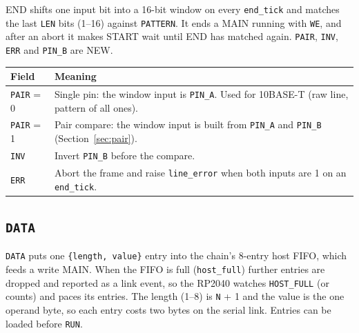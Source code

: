 \documentclass[11pt,a4paper]{article}
\newcommand{\new}{\textcolor{newc}{\textsf{\small NEW}}}
\newcommand{\sig}[1]{\texttt{#1}}
\begin{document}
END shifts one input bit into a 16-bit window on every \sig{end\_tick} and matches the last \sig{LEN} bits (1--16) against \sig{PATTERN}. It ends a MAIN running with \sig{WE}, and after an abort it makes START wait until END has matched again. \sig{PAIR}, \sig{INV}, \sig{ERR} and \sig{PIN\_B} are \new.

\begin{tabularx}{\linewidth}{@{}l>{\raggedright\arraybackslash}X@{}}
\toprule
Field & Meaning \\
\midrule
\sig{PAIR} = 0 & Single pin: the window input is \sig{PIN\_A}. Used for 10BASE-T (raw line, pattern of all ones). \\
\sig{PAIR} = 1 & Pair compare: the window input is built from \sig{PIN\_A} and \sig{PIN\_B} (Section~\ref{sec:pair}). \\
\sig{INV} & Invert \sig{PIN\_B} before the compare. \\
\sig{ERR} & Abort the frame and raise \sig{line\_error} when both inputs are 1 on an \sig{end\_tick}. \\
\bottomrule
\end{tabularx}

\subsection{\sig{DATA}}

\sig{DATA} puts one \texttt{\{length, value\}} entry into the chain's 8-entry host FIFO, which feeds a write MAIN. When the FIFO is full (\sig{host\_full}) further entries are dropped and reported as a link event, so the RP2040 watches \sig{HOST\_FULL} (or counts) and paces its entries. The length (1--8) is \sig{N} + 1 and the value is the one operand byte, so each entry costs two bytes on the serial link. Entries can be loaded before \sig{RUN}.
\end{document}
